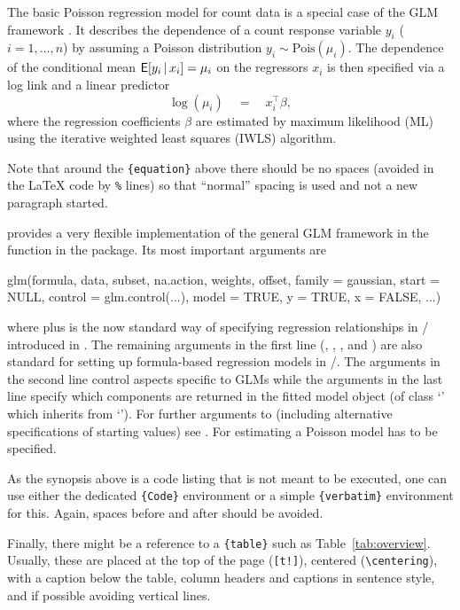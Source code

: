 \documentclass[article]{jss}
\newcommand{\class}[1]{`\code{#1}'}
\newcommand{\fct}[1]{\code{#1()}}
\begin{document}
The basic Poisson regression model for count data is a special case of the GLM
framework \cite{McCullagh+Nelder:1989}. It describes the dependence of a count
response variable $y_i$ ($i = 1, \dots, n$) by assuming a Poisson distribution
$y_i \sim \mathrm{Pois}(\mu_i)$. The dependence of the conditional mean
$\mathsf{E}[y_i \, | \, x_i] = \mu_i$ on the regressors $x_i$ is then specified via a
log link and a linear predictor
%
\begin{equation} \label{eq:mean}
  \log(\mu_i) \quad = \quad x_i^\top \beta,
\end{equation}
%
where the regression coefficients $\beta$ are estimated by maximum likelihood
(ML) using the iterative weighted least squares (IWLS) algorithm.

\begin{leftbar}
  Note that around the \verb|{equation}| above there should be no spaces (avoided
  in the {\LaTeX} code by \verb|%| lines) so that ``normal'' spacing is used and
  not a new paragraph started.
\end{leftbar}

 provides a very flexible implementation of the general GLM
framework in the function \fct{glm} \citep{Chambers+Hastie:1992} in the
 package. Its most important arguments are
\begin{Code}
  glm(formula, data, subset, na.action, weights, offset,
  family = gaussian, start = NULL, control = glm.control(...),
  model = TRUE, y = TRUE, x = FALSE, ...)
\end{Code}
where  plus  is the now standard way of specifying
regression relationships in / introduced in
\cite{Chambers+Hastie:1992}. The remaining arguments in the first line
(, , , and ) are also
standard  for setting up formula-based regression models in
/. The arguments in the second line control aspects
specific to GLMs while the arguments in the last line specify which components
are returned in the fitted model object (of class \class{glm} which inherits
from \class{lm}). For further arguments to \fct{glm} (including alternative
specifications of starting values) see . For estimating a Poisson
model  has to be specified.

\begin{leftbar}
  As the synopsis above is a code listing that is not meant to be executed,
  one can use either the dedicated \verb|{Code}| environment or a simple
  \verb|{verbatim}| environment for this. Again, spaces before and after should be
  avoided.

  Finally, there might be a reference to a \verb|{table}| such as
  Table~\ref{tab:overview}. Usually, these are placed at the top of the page
  (\verb|[t!]|), centered (\verb|\centering|), with a caption below the table,
  column headers and captions in sentence style, and if possible avoiding vertical
  lines.
\end{leftbar}
\end{document}
